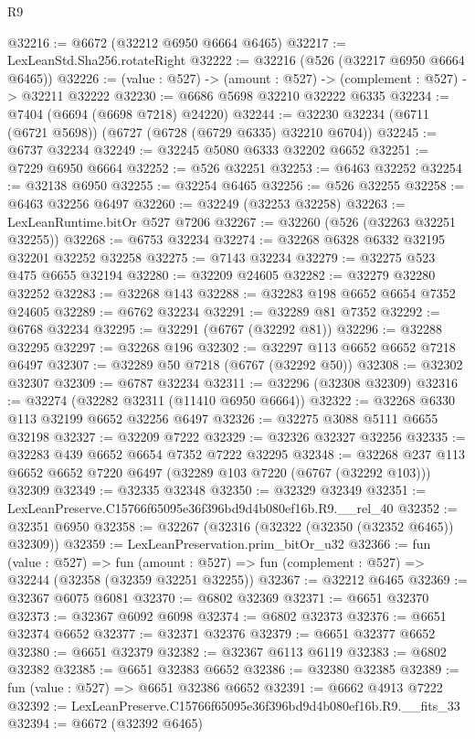 \begin{lexlean}{R9}
\begin{coremodule}
@32216 := @6672 (@32212 @6950 @6664 @6465)
@32217 := LexLeanStd.Sha256.rotateRight
@32222 := @32216 (@526 (@32217 @6950 @6664 @6465))
@32226 := (value : @527) -> (amount : @527) -> (complement : @527) -> @32211 @32222
@32230 := @6686 @5698 @32210 @32222 @6335
@32234 := @7404 (@6694 (@6698 @7218) @24220)
@32244 := @32230 @32234 (@6711 (@6721 @5698)) (@6727 (@6728 (@6729 @6335) @32210 @6704))
@32245 := @6737 @32234
@32249 := @32245 @5080 @6333 @32202 @6652
@32251 := @7229 @6950 @6664
@32252 := @526 @32251
@32253 := @6463 @32252
@32254 := @32138 @6950
@32255 := @32254 @6465
@32256 := @526 @32255
@32258 := @6463 @32256 @6497
@32260 := @32249 (@32253 @32258)
@32263 := LexLeanRuntime.bitOr @527 @7206
@32267 := @32260 (@526 (@32263 @32251 @32255))
@32268 := @6753 @32234
@32274 := @32268 @6328 @6332 @32195 @32201 @32252 @32258
@32275 := @7143 @32234
@32279 := @32275 @523 @475 @6655 @32194
@32280 := @32209 @24605
@32282 := @32279 @32280 @32252
@32283 := @32268 @143
@32288 := @32283 @198 @6652 @6654 @7352 @24605
@32289 := @6762 @32234
@32291 := @32289 @81 @7352
@32292 := @6768 @32234
@32295 := @32291 (@6767 (@32292 @81))
@32296 := @32288 @32295
@32297 := @32268 @196
@32302 := @32297 @113 @6652 @6652 @7218 @6497
@32307 := @32289 @50 @7218 (@6767 (@32292 @50))
@32308 := @32302 @32307
@32309 := @6787 @32234
@32311 := @32296 (@32308 @32309)
@32316 := @32274 (@32282 @32311 (@11410 @6950 @6664))
@32322 := @32268 @6330 @113 @32199 @6652 @32256 @6497
@32326 := @32275 @3088 @5111 @6655 @32198
@32327 := @32209 @7222
@32329 := @32326 @32327 @32256
@32335 := @32283 @439 @6652 @6654 @7352 @7222 @32295
@32348 := @32268 @237 @113 @6652 @6652 @7220 @6497 (@32289 @103 @7220 (@6767 (@32292 @103))) @32309
@32349 := @32335 @32348
@32350 := @32329 @32349
@32351 := LexLeanPreserve.C15766f65095e36f396bd9d4b080ef16b.R9.__rel_40
@32352 := @32351 @6950
@32358 := @32267 (@32316 (@32322 (@32350 (@32352 @6465)) @32309))
@32359 := LexLeanPreservation.prim_bitOr_u32
@32366 := fun (value : @527) =>
  fun (amount : @527) => fun (complement : @527) => @32244 (@32358 (@32359 @32251 @32255))
@32367 := @32212 @6465
@32369 := @32367 @6075 @6081
@32370 := @6802 @32369
@32371 := @6651 @32370
@32373 := @32367 @6092 @6098
@32374 := @6802 @32373
@32376 := @6651 @32374 @6652
@32377 := @32371 @32376
@32379 := @6651 @32377 @6652
@32380 := @6651 @32379
@32382 := @32367 @6113 @6119
@32383 := @6802 @32382
@32385 := @6651 @32383 @6652
@32386 := @32380 @32385
@32389 := fun (value : @527) => @6651 @32386 @6652
@32391 := @6662 @4913 @7222
@32392 := LexLeanPreserve.C15766f65095e36f396bd9d4b080ef16b.R9.__fits_33
@32394 := @6672 (@32392 @6465)

\end{coremodule}
\end{lexlean}
